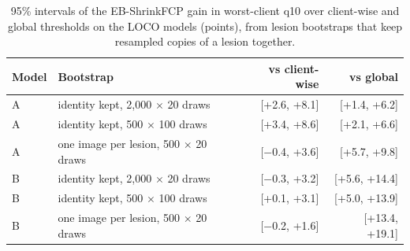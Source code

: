 \documentclass[10pt]{article}
\begin{document}
\begin{table}[!htbp]
\centering
\footnotesize
\caption{95\% intervals of the EB-ShrinkFCP gain in worst-client q10 over client-wise and global thresholds on the LOCO models (points), from lesion bootstraps that keep resampled copies of a lesion together.}
\label{tab:s6boot}
\begin{tabular}{@{}llrr@{}}
\toprule
Model & Bootstrap & vs client-wise & vs global \\
\midrule
A & identity kept, 2,000 $\times$ 20 draws & [+2.6, +8.1] & [+1.4, +6.2] \\
A & identity kept, 500 $\times$ 100 draws & [+3.4, +8.6] & [+2.1, +6.6] \\
A & one image per lesion, 500 $\times$ 20 draws & [$-$0.4, +3.6] & [+5.7, +9.8] \\
B & identity kept, 2,000 $\times$ 20 draws & [$-$0.3, +3.2] & [+5.6, +14.4] \\
B & identity kept, 500 $\times$ 100 draws & [+0.1, +3.1] & [+5.0, +13.9] \\
B & one image per lesion, 500 $\times$ 20 draws & [$-$0.2, +1.6] & [+13.4, +19.1] \\
\bottomrule
\end{tabular}
\end{table}
\end{document}
